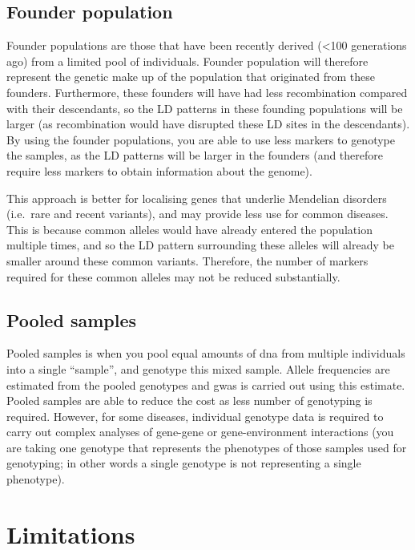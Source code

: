 \subsection{Founder population}
\label{sub:founder_population}

Founder populations are those that have been recently derived (\textless{}100 generations ago) from a limited pool of individuals.
Founder population will therefore represent the genetic make up of the population that originated from these founders.
Furthermore, these founders will have had less recombination compared with their descendants, so the LD patterns in these founding populations will be larger (as recombination would have disrupted these LD sites in the descendants).
By using the founder populations, you are able to use less markers to genotype the samples, as the LD patterns will be larger in the founders (and therefore require less markers to obtain information about the genome).

This approach is better for localising genes that underlie Mendelian disorders (i.e.\ rare and recent variants), and may provide less use for common diseases.
This is because common alleles would have already entered the population multiple times, and so the LD pattern surrounding these alleles will already be smaller around these common variants.
Therefore, the number of markers required for these common alleles may not be reduced substantially.

\subsection{Pooled samples}
\label{sub:pooled_samples}

Pooled samples is when you pool equal amounts  of \acrshort{dna} from multiple individuals into a single ``sample'', and genotype this mixed sample.
Allele frequencies are estimated from the pooled genotypes and \gls{gwas} is carried out using this estimate.
Pooled samples are able to reduce the cost as less number of genotyping is required.
However, for some diseases, individual genotype data is required to carry out complex analyses of gene-gene or gene-environment interactions (you are taking one genotype that represents the phenotypes of those samples used for genotyping; in other words a single genotype is not representing a single phenotype).

\section{Limitations}
\label{sec:limitations}

